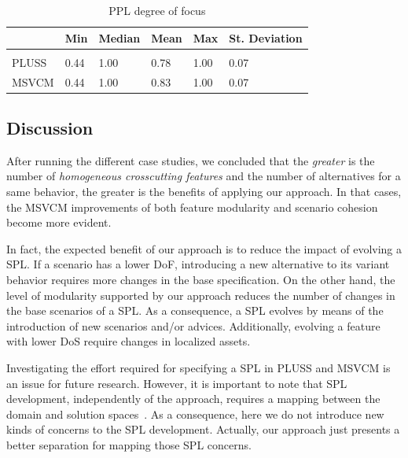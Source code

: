 \begin{table}[htb] \centering
\caption{PPL degree of focus}
\label{tab:ppl-dof}
\begin{small}
\begin{tabular}{llllll} \hline
					& Min 	& Median 	& Mean 	& Max 	& St. Deviation \\ \hline \\
	PLUSS			& 0.44	& 1.00		& 0.78	& 1.00	& 0.07			\\
	MSVCM	& 0.44  & 1.00   	& 0.83 	& 1.00 	& 0.07			\\ \hline	
\end{tabular}
\end{small}
\end{table}

\subsection{Discussion}

{\color{red} After running the different case studies, we concluded that the 
\emph{greater} is the number of \emph{homogeneous crosscutting features} and
the number of alternatives for a same behavior, the greater is the 
benefits of applying our approach. In that cases, the MSVCM improvements of 
both feature modularity and scenario cohesion become more evident. 

In fact, the expected benefit of our approach is to reduce the impact of
evolving a SPL. If a scenario has a lower DoF, introducing a new alternative to its variant behavior
requires more changes in the base specification. On the other hand, the level of
modularity supported by our approach reduces the number of changes in the base
scenarios of a SPL. As a consequence, a SPL evolves by means of the
introduction of new scenarios and/or advices. Additionally, evolving a feature
with lower DoS require changes in localized assets.  

Investigating the effort required for specifying a SPL in
PLUSS and MSVCM is an issue for future research. However, it is important
to note that SPL development, independently of the approach, requires a
mapping between the domain and solution spaces~\cite{Czarnecki:2000aa}. As a
consequence, here we do not introduce new kinds of concerns to the SPL
development. Actually, our approach just presents a better separation for
mapping those SPL concerns. }


